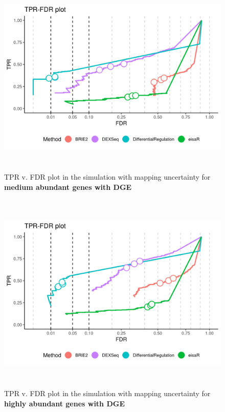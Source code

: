 \begin{figure}[!htb]
\begin{center}
\includegraphics[width=6in,height=3.8in]{../figures/simulation/minnow_simulation_mod_DGE_FDR.png}
\end{center}
\caption{TPR v. FDR plot in the simulation with mapping uncertainty for \textbf{medium abundant genes with DGE}}
\label{fig:soph_sim_DGE_FDR_mod}
\end{figure}

\begin{figure}[!htb]
\begin{center}
\includegraphics[width=6in,height=3.8in]{../figures/simulation/minnow_simulation_high_DGE_FDR.png}
\end{center}
\caption{TPR v. FDR plot in the simulation with mapping uncertainty for \textbf{highly abundant genes with DGE}}
\label{fig:soph_sim_DGE_FDR_high}
\end{figure}
\FloatBarrier

